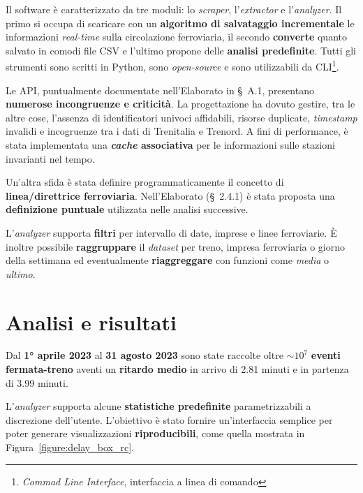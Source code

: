 \documentclass[italian]{article}
\begin{document}
Il software è caratterizzato da tre moduli: lo \textit{scraper},
l'\textit{extractor} e l'\textit{analyzer}.  Il primo si occupa di
scaricare con un \textbf{algoritmo di salvataggio incrementale} le
informazioni \textit{real-time} sulla circolazione ferroviaria, il
secondo \textbf{converte} quanto salvato in comodi file CSV e l'ultimo
propone delle \textbf{analisi predefinite}.  Tutti gli strumenti sono
scritti in Python, sono \textit{open-source} e sono utilizzabili da
CLI\footnote{\textit{Commad Line Interface}, interfaccia a linea di comando}.

Le API, puntualmente documentate nell'Elaborato in \S~A.1, presentano
\textbf{numerose incongruenze e criticità}.  La progettazione ha
dovuto gestire, tra le altre cose, l'assenza di identificatori univoci
affidabili, risorse duplicate, \textit{timestamp} invalidi e
incogruenze tra i dati di Trenitalia e Trenord.  A fini di
performance, è stata implementata una \textbf{\textit{cache}
    associativa} per le informazioni sulle stazioni invarianti nel
tempo.

Un'altra sfida è stata definire programmaticamente il concetto di
\textbf{linea/direttrice ferroviaria}.  Nell'Elaborato (\S~2.4.1) è
stata proposta una \textbf{definizione puntuale} utilizzata nelle
analisi successive.

L'\textit{analyzer} supporta \textbf{filtri} per intervallo di date,
imprese e linee ferroviarie.  È inoltre possibile \textbf{raggruppare}
il \textit{dataset} per treno, impresa ferroviaria o giorno della
settimana ed eventualmente \textbf{riaggreggare} con funzioni come
\textit{media} o \textit{ultimo}.

\section{Analisi e risultati}

Dal \textbf{1° aprile 2023} al \textbf{31 agosto 2023} sono state
raccolte oltre $\sim 10^7$ \textbf{eventi fermata-treno} aventi un
\textbf{ritardo medio} in arrivo di 2.81 minuti e in partenza di 3.99
minuti.

L'\textit{analyzer} supporta alcune \textbf{statistiche predefinite}
parametrizzabili a discrezione dell'utente.  L'obiettivo è stato
fornire un'interfaccia semplice per poter generare visualizzazioni
\textbf{riproducibili}, come quella mostrata in Figura~\ref{figure:delay_box_rc}.
\end{document}
